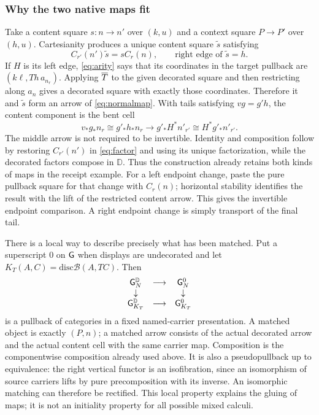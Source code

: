\documentclass[11pt]{article}
\numberwithin{equation}{section}
\theoremstyle{definition}\newtheorem{definition}[theorem]{Definition}
\newcommand{\B}{\mathcal B}\newcommand{\J}{\mathcal J}
\newcommand{\D}{\mathbb D}\newcommand{\N}{\mathbb N}
\newcommand{\Disc}{\mathrm{disc}}\newcommand{\st}{\mathbin{\star}}\newcommand{\di}{\mathbin{\diamond}}\newcommand{\bx}{\mathop{\boxtimes}}
\begin{document}
\subsubsection{Why the two native maps fit}
Take a content square $s:n\to n'$ over $(k,u)$ and a context square
$P\to P'$ over $(h,u)$. Cartesianity produces a unique content square
$\widetilde s$ satisfying
\begin{equation}\label{eq:factor}
 C_{r'}(n')\widetilde s=s C_r(n),
 \qquad\text{right edge of }\widetilde s=h.
\end{equation}
If $H$ is its left edge, \eqref{eq:arity} says that its coordinates in
the target pullback are $(k\ell,Th\,a_{n_r})$. Applying $\overline T$ to the
given decorated square and then restricting along $a_n$ gives a decorated
square with exactly those coordinates. Therefore it and $\widetilde s$
form an arrow of \eqref{eq:normalmap}. With tails satisfying $vg=g'h$,
the content component is the bent cell
\[
 v_*g_*n_r\cong g'_*h_*n_r
       \longrightarrow g'_*H^*n'_{r'}\cong H^*g'_*n'_{r'}.
\]
The middle arrow is not required to be invertible. Identity and composition
follow by restoring $C_{r'}(n')$ in \eqref{eq:factor} and using its unique
factorization, while the decorated factors compose in $\D$. Thus the
construction already retains both kinds of maps in the receipt example.
For a left endpoint change, paste the pure pullback square for that change
with $C_r(n)$; horizontal stability identifies the result with the lift
of the restricted content arrow. This gives the invertible endpoint
comparison. A right endpoint change is simply transport of the final tail.

There is a local way to describe precisely what has been matched. Put a
superscript $0$ on $\mathsf G$ when displays are undecorated and let
$K_T(A,C)=\Disc\B(A,TC)$. Then
\begin{equation}\label{eq:pullcat}
 \begin{array}{ccc}
 \grade_N^{\D}&\longrightarrow&\grade_N^0\\
 \downarrow&&\downarrow\\
 \grade_{K_T}^{\D}&\longrightarrow&\grade_{K_T}^0
 \end{array}
\end{equation}
is a pullback of categories in a fixed named-carrier presentation.
A matched object is exactly $(P,n)$; a matched arrow consists of the
actual decorated arrow and the actual content cell with the same carrier
map. Composition is the componentwise composition already used above.
It is also a pseudopullback up to equivalence: the right vertical functor
is an isofibration, since an isomorphism of source carriers lifts by pure
precomposition with its inverse. An isomorphic matching can therefore be
rectified. This local property explains the gluing of maps; it is not an
initiality property for all possible mixed calculi.
\end{document}
